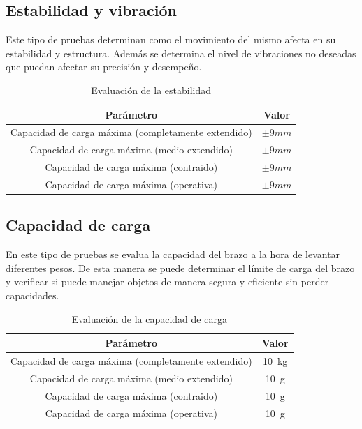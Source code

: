 \subsection{Estabilidad y vibración}
Este tipo de pruebas determinan como el movimiento del mismo afecta en su estabilidad y estructura. Además se determina el nivel de 
vibraciones no deseadas que puedan afectar su precisión y desempeño.
\begin{table}[H]
\begin{center}
\begin{tabular}{|c|c|}
\hline
\textbf{Parámetro} & \textbf{Valor} \\
\hline
Capacidad de carga máxima (completamente extendido) & $\pm9mm$\\
Capacidad de carga máxima (medio extendido) & $\pm9mm$\\
Capacidad de carga máxima (contraido) & $\pm9mm$\\
Capacidad de carga máxima (operativa) & $\pm9mm$\\
\hline
\end{tabular}
\caption{Evaluación de la estabilidad}
\label{cuadro:evaluacion_estabilidad}
\end{center}
\end{table}

\subsection{Capacidad de carga}
En este tipo de pruebas se evalua la capacidad del brazo a la hora de levantar diferentes pesos. De esta manera se puede determinar 
el límite de carga del brazo y verificar si puede manejar objetos de manera segura y eficiente sin perder capacidades.
\begin{table}[H]
\begin{center}
\begin{tabular}{|c|c|}
\hline
\textbf{Parámetro} & \textbf{Valor} \\
\hline
Capacidad de carga máxima (completamente extendido) & \SI{10}{\kilo\gram} \\
Capacidad de carga máxima (medio extendido) & \SI{10}{\gram} \\
Capacidad de carga máxima (contraido) & \SI{10}{\gram} \\
Capacidad de carga máxima (operativa) & \SI{10}{\gram} \\
\hline
\end{tabular}
\caption{Evaluación de la capacidad de carga}
\label{cuadro:evaluacion_carga}
\end{center}
\end{table}


